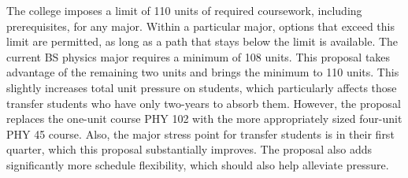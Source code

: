 \documentclass[12pt]{article}
\begin{document}
The college imposes a limit of 110 units of required coursework,
including prerequisites, for any major.  Within a particular major,
options that exceed this limit are permitted, as long as a path that
stays below the limit is available.  The current BS physics major
requires a minimum of 108 units.  This proposal takes advantage of the
remaining two units and brings the minimum to 110 units.  This
slightly increases total unit pressure on students, which particularly
affects those transfer students who have only two-years to absorb
them.  However, the proposal replaces the one-unit course PHY 102 with
the more appropriately sized four-unit PHY 45 course.  Also, the major
stress point for transfer students is in their first quarter, which
this proposal substantially improves.  The proposal also adds
significantly more schedule flexibility, which should also help
alleviate pressure.
\end{document}

